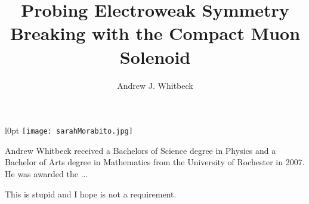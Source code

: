 \documentclass[12pt,oneside,final]{thesis}
\begin{document}
\title{Probing Electroweak Symmetry Breaking with the Compact Muon Solenoid}
\author{Andrew J. Whitbeck}
\dissertation
\doctorphilosophy
\copyrightnotice

















\begin{vita}

\begin{wrapfigure}{l}{0pt}
\texttt{[image: sarahMorabito.jpg]}
\end{wrapfigure}

Andrew Whitbeck received a Bachelors of Science degree in Physics and 
a Bachelor of Arts degree in Mathematics from the University of Rochester 
in 2007.  He was awarded the ...

This is stupid and I hope is not a requirement.

\end{vita}
\end{document}
